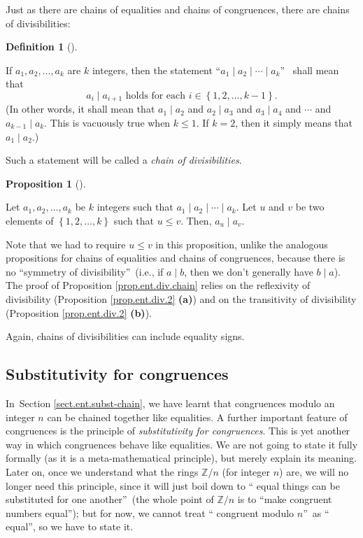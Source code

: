 \documentclass[numbers=enddot,12pt,final,onecolumn,notitlepage]{scrartcl}%
\numberwithin{exer}{subsection}
\theoremstyle{definition}
\newtheorem{prop}[theo]{Proposition}
\newenvironment{proposition}[1][]
{\begin{prop}[#1]\begin{leftbar}}
{\end{leftbar}\end{prop}}
\newtheorem{defi}[theo]{Definition}
\newenvironment{definition}[1][]
{\begin{defi}[#1]\begin{leftbar}}
{\end{leftbar}\end{defi}}
\begin{document}
Just as there are chains of equalities and chains of congruences, there are
chains of divisibilities:

\begin{definition}
If $a_{1},a_{2},\ldots,a_{k}$ are $k$ integers, then the statement
\textquotedblleft$a_{1}\mid a_{2}\mid\cdots\mid a_{k}$\textquotedblright%
\ shall mean that
\[
a_{i}\mid a_{i+1}\text{ holds for each }i\in\left\{  1,2,\ldots,k-1\right\}
.
\]
(In other words, it shall mean that $a_{1}\mid a_{2}$ and $a_{2}\mid a_{3}$
and $a_{3}\mid a_{4}$ and $\cdots$ and $a_{k-1}\mid a_{k}$. This is vacuously
true when $k\leq1$. If $k=2$, then it simply means that $a_{1}\mid a_{2}$.)

Such a statement will be called a \textit{chain of divisibilities}.
\end{definition}

\begin{proposition}
\label{prop.ent.div.chain}Let $a_{1},a_{2},\ldots,a_{k}$ be $k$ integers such
that $a_{1}\mid a_{2}\mid\cdots\mid a_{k}$. Let $u$ and $v$ be two elements of
$\left\{  1,2,\ldots,k\right\}  $ such that $u\leq v$. Then, $a_{u}\mid a_{v}$.
\end{proposition}

Note that we had to require $u\leq v$ in this proposition, unlike the
analogous propositions for chains of equalities and chains of congruences,
because there is no \textquotedblleft symmetry of
divisibility\textquotedblright\ (i.e., if $a\mid b$, then we don't generally
have $b\mid a$). The proof of Proposition \ref{prop.ent.div.chain} relies on
the reflexivity of divisibility (Proposition \ref{prop.ent.div.2}
\textbf{(a)}) and on the transitivity of divisibility (Proposition
\ref{prop.ent.div.2} \textbf{(b)}).

Again, chains of divisibilities can include equality signs.

\subsection{\label{sect.ent.subst-mod}Substitutivity for congruences}

In\ Section \ref{sect.ent.subst-chain}, we have learnt that congruences modulo
an integer $n$ can be chained together like equalities. A further important
feature of congruences is the principle of \textit{substitutivity for
congruences}. This is yet another way in which congruences behave like
equalities. We are not going to state it fully formally (as it is a
meta-mathematical principle), but merely explain its meaning. Later on, once
we understand what the rings $\mathbb{Z}/n$ (for integer $n$) are, we will no
longer need this principle, since it will just boil down to \textquotedblleft
equal things can be substituted for one another\textquotedblright\ (the whole
point of $\mathbb{Z}/n$ is to \textquotedblleft make congruent numbers
equal\textquotedblright); but for now, we cannot treat \textquotedblleft
congruent modulo $n$\textquotedblright\ as \textquotedblleft
equal\textquotedblright, so we have to state it.
\end{document}
